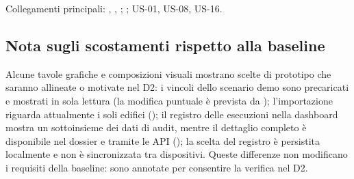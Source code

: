 Collegamenti principali: , , ; ; US-01, US-08, US-16.

\subsection{Nota sugli scostamenti rispetto alla baseline}
Alcune tavole grafiche e composizioni visuali mostrano scelte di prototipo che saranno allineate o motivate nel D2: i vincoli dello scenario demo sono precaricati e mostrati in sola lettura (la modifica puntuale è prevista da ); l'importazione riguarda attualmente i soli edifici (); il registro delle esecuzioni nella dashboard mostra un sottoinsieme dei dati di audit, mentre il dettaglio completo è disponibile nel dossier e tramite le API (); la scelta del registro è persistita localmente e non è sincronizzata tra dispositivi. Queste differenze non modificano i requisiti della baseline: sono annotate per consentire la verifica nel D2.
